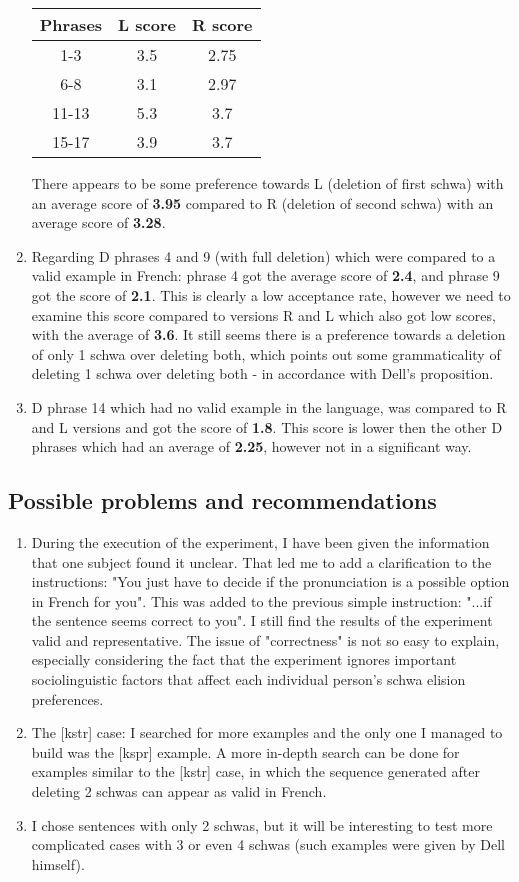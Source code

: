 \documentclass{article}
\begin{document}
\begin{enumerate}
\begin{center}
\begin{tabular}{||c c c||} 
 \hline
 Phrases & L score & R score\\ [0.5ex] 
 \hline\hline
 1-3 & 3.5 & 2.75\\ 
 \hline
 6-8 & 3.1 & 2.97\\ 
 \hline
 11-13 & 5.3 & 3.7\\ 
 \hline
 15-17 & 3.9 & 3.7\\ 
 \hline
\end{tabular}
\end{center}
There appears to be some preference towards L (deletion of first schwa) with an average score of \textbf{3.95} compared to R (deletion of second schwa) with an average score of \textbf{3.28}.
  \item Regarding D phrases 4 and 9 (with full deletion) which were compared to a valid example in French: phrase 4 got the average score of \textbf{2.4}, and phrase 9 got the score of \textbf{2.1}.  This is clearly a low acceptance rate, however we need to examine this score compared to versions R and L which also got low scores, with the average of \textbf{3.6}. It still seems there is a preference towards a deletion of only 1 schwa over deleting both, which points out some grammaticality of deleting 1 schwa over deleting both - in accordance with Dell's proposition.
  \item D phrase 14 which had no valid example in the language, was compared to R and L versions and got the score of \textbf{1.8}. This score is lower then the other D phrases which had an average of \textbf{2.25}, however not in a significant way.
\end{enumerate}

\subsection{Possible problems and recommendations}
\begin{enumerate}
  \item During the execution of the experiment, I have been given the information that one subject found it unclear. That led me to add a clarification to the instructions: "You just have to decide if the pronunciation is a possible option in French for you".  This was added to the previous simple instruction: "...if the sentence seems correct to you". I still find the results of the experiment valid and representative. The issue of "correctness" is not so easy to explain, especially considering the fact that the experiment ignores important sociolinguistic factors that affect each individual person's schwa elision preferences.
  \item The [kstr] case: I searched for more examples and the only one I managed to build was the [kspr] example.
A more in-depth search can be done for examples similar to the [kstr] case, in which the sequence generated after deleting 2 schwas can appear as valid in French. 
  \item I chose sentences with only 2 schwas, but it will be interesting to test more complicated cases with 3 or even 4 schwas (such examples were given by Dell himself).
\end{enumerate}
\end{document}
